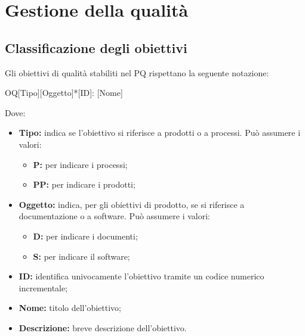 \documentclass[../NormediProgetto.tex]{subfiles}
\begin{document}

\section{Gestione della qualità}

\subsection{Classificazione degli obiettivi}

Gli obiettivi di qualità stabiliti nel PQ rispettano la seguente notazione:

    \begin{center}
        OQ[Tipo][Oggetto]*[ID]: [Nome]
    \end{center}
    
Dove:

\begin{itemize}
    \item \textbf{Tipo:} indica se l'obiettivo si riferisce a prodotti o a processi. Può assumere i valori:
    
    \begin{itemize}
        \item \textbf{P:} per indicare i processi;
        \item \textbf{PP:} per indicare i prodotti;
    \end{itemize}
    
    \item \textbf{Oggetto:} indica, per gli obiettivi di prodotto, se si riferisce a documentazione o a software. Può assumere i valori:
    
    \begin{itemize}
        \item \textbf{D:} per indicare i documenti;
        \item \textbf{S:} per indicare il software;
    \end{itemize}
    
    \item \textbf{ID:} identifica univocamente l'obiettivo tramite un codice numerico incrementale;
    
    \item \textbf{Nome:} titolo dell'obiettivo;
    
    \item \textbf{Descrizione:} breve descrizione dell'obiettivo.
\end{itemize}
\end{document}
